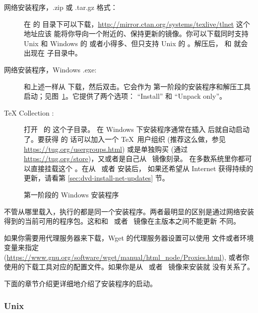 \documentclass{article}
\begin{document}
\begin{description}
  \item [网络安装程序，.zip 或 .tar.gz 格式：] 在 \CTAN 的 
        目录下可以下载，\url{http://mirror.ctan.org/systems/texlive/tlnet} 这个地址应该
        能将你导向一个附近的、保持更新的镜像。你可以下载同时支持 Unix 和
        Windows 的  或者小得多、但只支持 Unix 的
        。解压后， 和
         就会出现在  子目录中。

  \item[网络安装程序，Windows .exe:] 和上述一样从 \CTAN{} 下载，然后双击。它会作为
    第一阶段的安装程序和解压工具启动；见图~\ref{fig:nsis}。它提供了两个选项：
    ``Install'' 和 ``Unpack only''。

  \item [\TeX{} Collection \DVD:] 打开 \DVD\ 的  这个子目录。
        在 Windows 下安装程序通常在插入 \DVD 后就自动启动了。要获得 \DVD 的
        话可以加入一个 \TeX\ 用户组织 (推荐这么做，参见
        \url{https://tug.org/usergroups.html}) 或是单独购买 (通过
        \url{https://tug.org/store})，又或者是自己从 \ISO\ 镜像刻录。
        在多数系统里你都可以直接挂载这个 \ISO{}。在从 \DVD\ 或者 \ISO{} 安装后，
        如果还希望从 Internet 获得持续的更新，请看第 \ref{sec:dvd-install-net-updates}
        节。

\end{description}

\begin{figure}[tb]
  \caption{第一阶段的 Windows  安装程序}\label{fig:nsis}
\end{figure}

不管从哪里载入，执行的都是同一个安装程序。两者最明显的区别是通过网络安装
得到的当前可用的程序包。这和和 \DVD\ 或者 \ISO\ 镜像在主版本之间不能更新
不同。

如果你需要用代理服务器来下载，Wget 的代理服务器设置可以使用 
文件或者环境变量来指定
(\url{https://www.gnu.org/software/wget/manual/html_node/Proxies.html}),
或者你使用的下载工具对应的配置文件。如果你是从 \DVD\ 或者 \ISO\ 镜像来安装就
没有关系了。

下面的章节介绍更详细地介绍了安装程序的启动。

\subsubsection{Unix}
\end{document}
